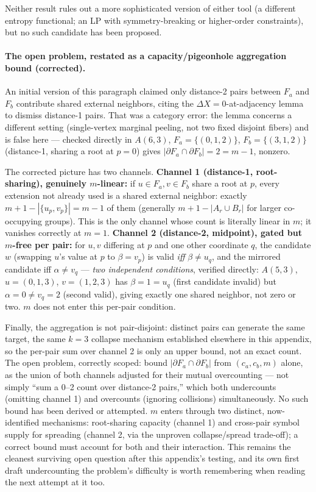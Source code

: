 Neither result rules out a more sophisticated version of either tool
(a different entropy functional; an LP with symmetry-breaking or
higher-order constraints), but no such candidate has been proposed.

\paragraph{The open problem, restated as a capacity/pigeonhole
aggregation bound (corrected).} An initial version of this paragraph
claimed only distance-2 pairs between $F_a$ and $F_b$ contribute shared
external neighbors, citing the $\Delta X=0$-at-adjacency lemma to
dismiss distance-1 pairs. That was a category error: the lemma concerns
a different setting (single-vertex marginal peeling, not two fixed
disjoint fibers) and is false here --- checked directly in $A(6,3)$,
$F_a=\{(0,1,2)\}$, $F_b=\{(3,1,2)\}$ (distance-1, sharing a root at
$p=0$) gives $|\partial F_a\cap\partial F_b|=2=m-1$, nonzero.

The corrected picture has two channels. \textbf{Channel 1 (distance-1,
root-sharing), genuinely $m$-linear:} if $u\in F_a,v\in F_b$ share a
root at $p$, every extension not already used is a shared external
neighbor: exactly $m+1-|\{u_p,v_p\}|=m-1$ of them (generally
$m+1-|A_r\cup B_r|$ for larger co-occupying groups). This is the only
channel whose count is literally linear in $m$; it vanishes correctly
at $m=1$. \textbf{Channel 2 (distance-2, midpoint), gated but
$m$-free per pair:} for $u,v$ differing at $p$ and one other coordinate
$q$, the candidate $w$ (swapping $u$'s value at $p$ to $\beta=v_p$) is
valid \emph{iff} $\beta\ne u_q$, and the mirrored candidate iff
$\alpha\ne v_q$ --- \emph{two independent conditions}, verified
directly: $A(5,3)$, $u=(0,1,3)$, $v=(1,2,3)$ has $\beta=1=u_q$ (first
candidate invalid) but $\alpha=0\ne v_q=2$ (second valid), giving
exactly one shared neighbor, not zero or two. $m$ does not enter this
per-pair condition.

Finally, the aggregation is not pair-disjoint: distinct pairs can
generate the same target, the same $k=3$ collapse mechanism established
elsewhere in this appendix, so the per-pair sum over channel 2 is only
an upper bound, not an exact count. The open problem, correctly scoped:
bound $|\partial F_a\cap\partial F_b|$ from $(c_a,c_b,m)$ alone, as the
union of both channels adjusted for their mutual overcounting --- not
simply ``sum a 0--2 count over distance-2 pairs,'' which both
undercounts (omitting channel 1) and overcounts (ignoring collisions)
simultaneously. No such bound has been derived or attempted. $m$ enters
through two distinct, now-identified mechanisms: root-sharing capacity
(channel 1) and cross-pair symbol supply for spreading (channel 2, via
the unproven collapse/spread trade-off); a correct bound must account
for both and their interaction. This remains the cleanest surviving
open question after this appendix's testing, and its own first draft
undercounting the problem's difficulty is worth remembering when
reading the next attempt at it too.

